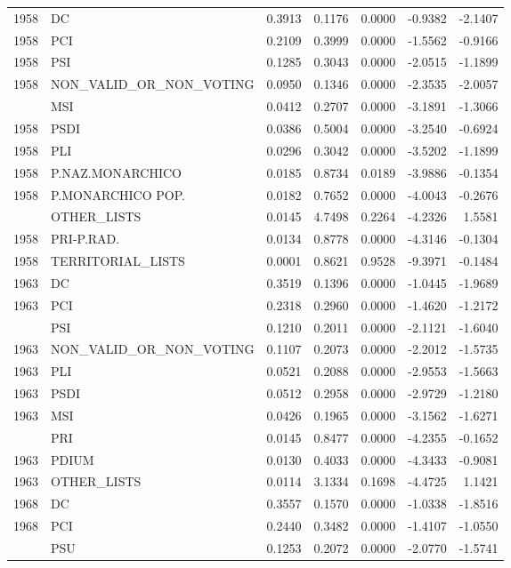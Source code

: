 \begin{longtable}[t]{rlrrrrr}
1958 & DC & 0.3913 & 0.1176 & 0.0000 & -0.9382 & -2.1407\\
1958 & PCI & 0.2109 & 0.3999 & 0.0000 & -1.5562 & -0.9166\\
1958 & PSI & 0.1285 & 0.3043 & 0.0000 & -2.0515 & -1.1899\\
1958 & NON\_VALID\_OR\_NON\_VOTING & 0.0950 & 0.1346 & 0.0000 & -2.3535 & -2.0057\\
\addlinespace
1958 & MSI & 0.0412 & 0.2707 & 0.0000 & -3.1891 & -1.3066\\
1958 & PSDI & 0.0386 & 0.5004 & 0.0000 & -3.2540 & -0.6924\\
1958 & PLI & 0.0296 & 0.3042 & 0.0000 & -3.5202 & -1.1899\\
1958 & P.NAZ.MONARCHICO & 0.0185 & 0.8734 & 0.0189 & -3.9886 & -0.1354\\
1958 & P.MONARCHICO POP. & 0.0182 & 0.7652 & 0.0000 & -4.0043 & -0.2676\\
\addlinespace
1958 & OTHER\_LISTS & 0.0145 & 4.7498 & 0.2264 & -4.2326 & 1.5581\\
1958 & PRI-P.RAD. & 0.0134 & 0.8778 & 0.0000 & -4.3146 & -0.1304\\
1958 & TERRITORIAL\_LISTS & 0.0001 & 0.8621 & 0.9528 & -9.3971 & -0.1484\\
1963 & DC & 0.3519 & 0.1396 & 0.0000 & -1.0445 & -1.9689\\
1963 & PCI & 0.2318 & 0.2960 & 0.0000 & -1.4620 & -1.2172\\
\addlinespace
1963 & PSI & 0.1210 & 0.2011 & 0.0000 & -2.1121 & -1.6040\\
1963 & NON\_VALID\_OR\_NON\_VOTING & 0.1107 & 0.2073 & 0.0000 & -2.2012 & -1.5735\\
1963 & PLI & 0.0521 & 0.2088 & 0.0000 & -2.9553 & -1.5663\\
1963 & PSDI & 0.0512 & 0.2958 & 0.0000 & -2.9729 & -1.2180\\
1963 & MSI & 0.0426 & 0.1965 & 0.0000 & -3.1562 & -1.6271\\
\addlinespace
1963 & PRI & 0.0145 & 0.8477 & 0.0000 & -4.2355 & -0.1652\\
1963 & PDIUM & 0.0130 & 0.4033 & 0.0000 & -4.3433 & -0.9081\\
1963 & OTHER\_LISTS & 0.0114 & 3.1334 & 0.1698 & -4.4725 & 1.1421\\
1968 & DC & 0.3557 & 0.1570 & 0.0000 & -1.0338 & -1.8516\\
1968 & PCI & 0.2440 & 0.3482 & 0.0000 & -1.4107 & -1.0550\\
\addlinespace
1968 & PSU & 0.1253 & 0.2072 & 0.0000 & -2.0770 & -1.5741\\

\end{longtable}
